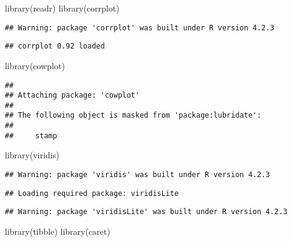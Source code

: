 \documentclass[
]{article}
\newenvironment{Shaded}{\begin{snugshade}}{\end{snugshade}}
\newcommand{\FunctionTok}[1]{\textcolor[rgb]{0.00,0.00,0.00}{#1}}
\newcommand{\NormalTok}[1]{#1}
\begin{document}
\begin{Shaded}
\begin{Highlighting}[]
\FunctionTok{library}\NormalTok{(readr)}
\FunctionTok{library}\NormalTok{(corrplot)}
\end{Highlighting}
\end{Shaded}

\begin{verbatim}
## Warning: package 'corrplot' was built under R version 4.2.3
\end{verbatim}

\begin{verbatim}
## corrplot 0.92 loaded
\end{verbatim}

\begin{Shaded}
\begin{Highlighting}[]
\FunctionTok{library}\NormalTok{(cowplot)}
\end{Highlighting}
\end{Shaded}

\begin{verbatim}
## 
## Attaching package: 'cowplot'
## 
## The following object is masked from 'package:lubridate':
## 
##     stamp
\end{verbatim}

\begin{Shaded}
\begin{Highlighting}[]
\FunctionTok{library}\NormalTok{(viridis)}
\end{Highlighting}
\end{Shaded}

\begin{verbatim}
## Warning: package 'viridis' was built under R version 4.2.3
\end{verbatim}

\begin{verbatim}
## Loading required package: viridisLite
\end{verbatim}

\begin{verbatim}
## Warning: package 'viridisLite' was built under R version 4.2.3
\end{verbatim}

\begin{Shaded}
\begin{Highlighting}[]
\FunctionTok{library}\NormalTok{(tibble)}
\FunctionTok{library}\NormalTok{(caret)}
\end{Highlighting}
\end{Shaded}
\end{document}
